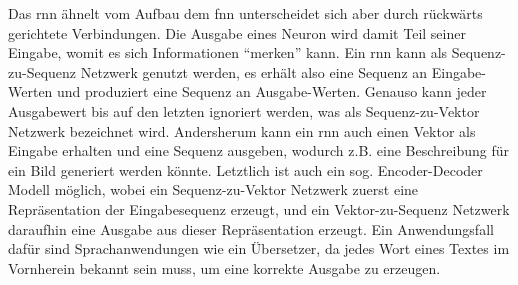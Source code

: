 Das \ac{rnn} ähnelt vom Aufbau dem \ac{fnn} unterscheidet sich aber durch rückwärts gerichtete Verbindungen. Die Ausgabe eines Neuron wird damit Teil seiner Eingabe, womit es sich Informationen "`merken"' kann. Ein \ac{rnn} kann als Sequenz-zu-Sequenz Netzwerk genutzt werden, es erhält also eine Sequenz an Eingabe-Werten und produziert eine Sequenz an Ausgabe-Werten. Genauso kann jeder Ausgabewert bis auf den letzten ignoriert werden, was als Sequenz-zu-Vektor Netzwerk bezeichnet wird. Andersherum kann ein \ac{rnn} auch einen Vektor als Eingabe erhalten und eine Sequenz ausgeben, wodurch z.B. eine Beschreibung für ein Bild generiert werden könnte. Letztlich ist auch ein sog. Encoder-Decoder Modell möglich, wobei ein Sequenz-zu-Vektor Netzwerk zuerst eine Repräsentation der Eingabesequenz erzeugt, und ein Vektor-zu-Sequenz Netzwerk daraufhin eine Ausgabe aus dieser Repräsentation erzeugt. Ein Anwendungsfall dafür sind Sprachanwendungen wie ein Übersetzer, da jedes Wort eines Textes im Vornherein bekannt sein muss, um eine korrekte Ausgabe zu erzeugen. \cite[vgl. S. 497 ff.]{Geron2019}
